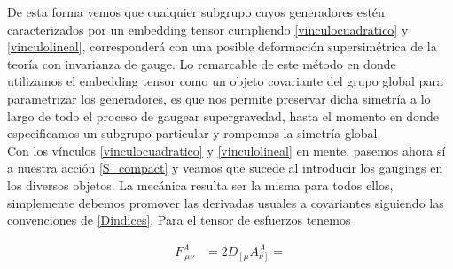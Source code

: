 \documentclass{article}
\numberwithin{equation}{section}
\begin{document}
De esta forma vemos que cualquier subgrupo cuyos generadores estén caracterizados por un embedding tensor cumpliendo \ref{vinculocuadratico} y \ref{vinculolineal}, corresponderá con una posible deformación supersimétrica de la teoría con invarianza de gauge. Lo remarcable de este método en donde utilizamos el embedding tensor como un objeto covariante del grupo global para parametrizar los generadores, es que nos permite preservar dicha simetría a lo largo de todo el proceso de gaugear supergravedad, hasta el momento en donde especificamos un subgrupo particular y rompemos la simetría global.\\

Con los vínculos \ref{vinculocuadratico} y \ref{vinculolineal} en mente, pasemos ahora sí a nuestra acción \ref{S_compact} y veamos que sucede al introducir los gaugings en los diversos objetos. La mecánica resulta ser la misma para todos ellos, simplemente debemos promover las derivadas usuales a covariantes siguiendo las convenciones de \ref{Dindices}. Para el tensor de esfuerzos tenemos

\begin{equation}
\begin{aligned}
F^A_{\ \mu \nu} &= 2 D_{\left[ \mu \right.} A^A_{\left. \nu\right]} = 
\end{aligned}
\end{equation}

	 
\end{document}
